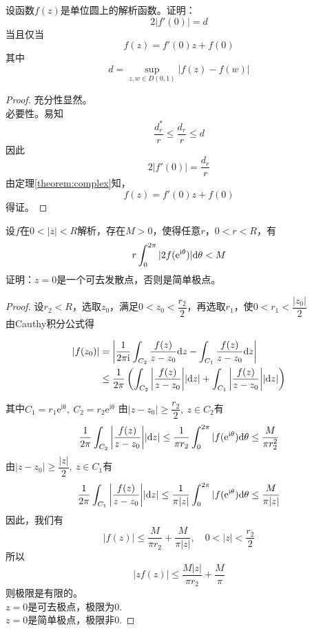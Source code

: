 \begin{theorem}

    设函数$f(z)$是单位圆上的解析函数。证明：
    $$2|f'(0)| = d$$
    当且仅当
    $$f(z) = f'(0)z + f(0)$$
    其中
    $$d =\sup\limits_{z,w\in D(0,1)}{|f(z) - f(w)|}$$
    
\end{theorem}

\begin{proof}

    充分性显然。\\
    必要性。易知
    $$\dfrac{d_r^{*}}{r} \leq \dfrac{d_r}{r} \leq d$$
    因此
    $$2|f'(0)| = \dfrac{d_r}{r}$$
    由定理\ref{theorem:complex}知，
    $$f(z) = f'(0)z + f(0)$$
    得证。

\end{proof}

\begin{proposition}
    
    设$f$在$0 < |z| < R$解析，存在$M >0$，使得任意$r$，$0 < r < R$，有
    $$r \int_{0}^{2 \pi}{|2f(\mathrm{e^{i\theta}})|}\mathrm{d} \theta < M$$
    证明：$z=0$是一个可去发散点，否则是简单极点。

\end{proposition}

\begin{proof}
    
    设$r_2 < R$，选取$z_0$，满足$0 < z_0 < \dfrac{r_2}{2}$，再选取$r_1$，使$0 < r_1 < \dfrac{|z_0|}{2}$\\
    由\textup{Cauthy}积分公式得

    \begin{align*}
        |f(z_0)| & = \left| \dfrac{1}{2\mathrm{\pi i}} \int_{C_2}{\dfrac{f(z)}{z-z_0}}\mathrm{d} z - \int_{C_1}{\dfrac{f(z)}{z-z_0}}\mathrm{d} z \right|\\
        & \leq \dfrac{1}{2 \pi} \left(\int_{C_2}{\left|\dfrac{f(z)}{z-z_0}\right|}|\mathrm{d} z| + \int_{C_1}{\left|\dfrac{f(z)}{z-z_0}\right|}|\mathrm{d} z|\right)
    \end{align*}

    其中$C_1 = r_1\mathrm{e^{i\theta}},\ C_2 = r_2\mathrm{e^{i\theta}}$
    由$|z-z_0| \geq \dfrac{r_2}{2},\ z \in C_2$有
    $$ \dfrac{1}{2 \pi} \int_{C_2}{\left| \dfrac{f(z)}{z-z_0}\right|}|\mathrm{d} z| \leq \dfrac{1}{ \pi r_2}\int_{0}^{2 \pi}{|f(\mathrm{e}^{\mathrm{i}\theta})}\mathrm{d} \theta \leq \dfrac{M}{ \pi r_2^2}$$
    由$|z-z_0| \geq \dfrac{|z|}{2},\ z \in C_1$有
    $$ \dfrac{1}{2 \pi} \int_{C_1}{\left| \dfrac{f(z)}{z-z_0}\right|}|\mathrm{d} z| \leq \dfrac{1}{ \pi|z|}\int_{0}^{2 \pi}{|f(\mathrm{e}^{\mathrm{i}\theta})}\mathrm{d} \theta \leq \dfrac{M}{ \pi|z|}$$
    因此，我们有
    $$|f(z)| \leq \dfrac{M}{ \pi r_2} + \dfrac{M}{ \pi|z|},\quad 0 < |z| < \dfrac{r_2}{2}$$
    所以$$|zf(z)| \leq \dfrac{M|z|}{ \pi r_2} + \dfrac{M}{\pi}$$
    则极限是有限的。\\
    $z=0$是可去极点，极限为$0$.\\
    $z=0$是简单极点，极限非$0$.

\end{proof}

